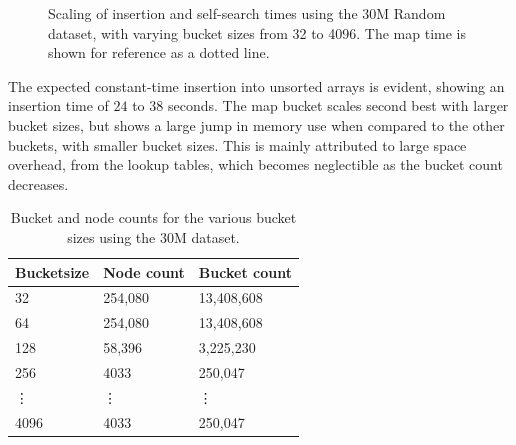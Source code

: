\begin{landscape}
\begin{figure}[h]
{        }
        \caption{Scaling of insertion and self-search times using the 30M Random
        dataset, with varying bucket sizes from 32 to 4096. The {\keyword map} time
        is shown for reference as a dotted line.}
        \label{fig:seq_30m}
    \end{figure}
\end{landscape}

The expected constant-time insertion into unsorted arrays is evident, showing
an insertion time of $24$ to $38$ seconds.
The {\keyword map} bucket scales second best with larger bucket sizes, but
shows a large jump in memory use when compared to the other buckets, with smaller
bucket sizes. This is mainly attributed to large space overhead, from the
lookup tables, which becomes neglectible as the bucket count decreases.

\begin{table}[h]
    \centering
    \begin{tabular}[here]{ l l l }
        \hline
        Bucketsize& Node count  & Bucket count  \\\hline
        32        &  254,080    & 13,408,608  \\
        64        &  254,080    & 13,408,608  \\
        128       &  58,396     & 3,225,230   \\
        256       &  4033       & 250,047     \\
        \vdots    &  \vdots     & \vdots      \\
        4096      &  4033       & 250,047     \\\hline 
    \end{tabular}
    \caption{Bucket and node counts for the various bucket sizes using the
        30M dataset.}
    \label{tab:bncounts_30M}
\end{table}

